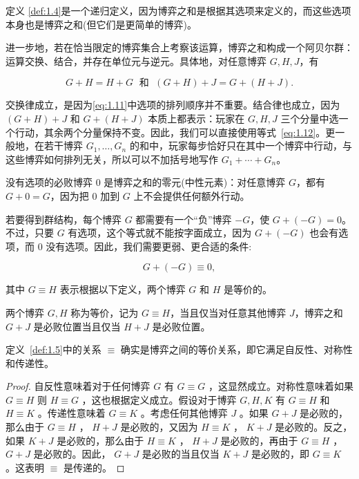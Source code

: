 定义 \ref{def:1.4}是一个递归定义，因为博弈之和是根据其选项来定义的，而这些选项本身也是博弈之和(但它们是更简单的博弈)。

进一步地，若在恰当限定的博弈集合上考察该运算，博弈之和构成一个阿贝尔群：运算交换、结合，并存在单位元与逆元。具体地，对任意博弈 $G,H,J$，有

\begin{equation}
G + H = H + G\;\text{ 和 }\;\left( {G + H}\right)  + J = G + \left( {H + J}\right). \label{eq:1.12}
\end{equation}

交换律成立，是因为\eqref{eq:1.11}中选项的排列顺序并不重要。结合律也成立，因为 \(\left( {G + H}\right)+J\) 和 \(G+\left( {H+J}\right)\) 本质上都表示：玩家在 \(G,H,J\) 三个分量中选一个行动，其余两个分量保持不变。因此，我们可以直接使用等式~\eqref{eq:1.12}。更一般地，在若干博弈 \({G}_{1},\ldots,{G}_{n}\) 的和中，玩家每步恰好只在其中一个博弈中行动，与这些博弈如何排列无关，所以可以不加括号地写作 \({G}_{1}+\cdots+{G}_{n}\)。

没有选项的必败博弈 0 是博弈之和的零元(中性元素)：对任意博弈 \(G\)，都有 \(G+0=G\)，因为把 0 加到 \(G\) 上不会提供任何额外行动。

若要得到群结构，每个博弈 \(G\) 都需要有一个“负”博弈 \(-G\)，使 \(G+\left({-G}\right)=0\)。不过，只要 \(G\) 有选项，这个等式就不能按字面成立，因为 \(G+\left({-G}\right)\) 也会有选项，而 0 没有选项。因此，我们需要更弱、更合适的条件:

\begin{equation}
G + \left( {-G}\right)  \equiv  0, \label{eq:1.13} 
\end{equation}

其中 \(G \equiv  H\) 表示根据以下定义，两个博弈 \(G\) 和 \(H\) 是等价的。
\begin{definition}\label{def:1.5}
两个博弈 \(G,H\) 称为等价，记为 \(G \equiv H\)，当且仅当对任意其他博弈 \(J\)，博弈之和 \(G+J\) 是必败位置当且仅当 \(H+J\) 是必败位置。 \end{definition}

\begin{lemma}\label{lem:1.6}
定义~\ref{def:1.5}中的关系 \(\equiv\) 确实是博弈之间的等价关系，即它满足自反性、对称性和传递性。
\end{lemma}
\begin{proof}
自反性意味着对于任何博弈 \(G\) 有 \(G \equiv  G\) ，这显然成立。对称性意味着如果 \(G \equiv  H\) 则 \(H \equiv  G\) ，这也根据定义成立。假设对于博弈 \(G,H,K\) 有 \(G \equiv  H\) 和 \(H \equiv  K\) 。传递性意味着 \(G \equiv  K\) 。考虑任何其他博弈 \(J\) 。如果 \(G + J\) 是必败的，那么由于 \(G \equiv  H\) ， \(H + J\) 是必败的，又因为 \(H \equiv  K\) ， \(K + J\) 是必败的。反之，如果 \(K + J\) 是必败的，那么由于 \(H \equiv  K\) ， \(H + J\) 是必败的，再由于 \(G \equiv  H\) ， \(G + J\) 是必败的。因此， \(G + J\) 是必败的当且仅当 \(K + J\) 是必败的，即 \(G \equiv  K\) 。这表明 \(\equiv\) 是传递的。
\end{proof}


